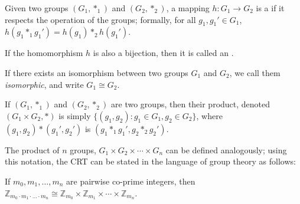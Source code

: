 \begin{frame}

Given two groups $(G_1,\ast_1)$ and $(G_2,\ast_2)$, a mapping
$h:G_1\longrightarrow G_2$ is a  if it respects the
operation of the groups; formally, for all $g_1,g_1'\in G_1$,
$h(g_1\ast_1g_1')=h(g_1)\ast_2h(g_1')$.  

If the homomorphism $h$ is
also a bijection, then it is called an .  

If there
exists an isomorphism between two groups $G_1$ and $G_2$, we call them
{\em isomorphic}, and write $G_1\cong G_2$.

If $(G_1,\ast_1)$ and $(G_2,\ast_2)$ are two groups, then their
product, denoted $(G_1\times G_2,\ast)$ is simply $\{(g_1,g_2):g_1\in
G_1,g_2\in G_2\}$, where $(g_1,g_2)\ast(g_1',g_2')$ is
$(g_1\ast_1g_1',g_2\ast_2g_2')$.  

The product of $n$ groups,
$G_1\times G_2\times\cdots\times G_n$ can be defined analogously;
using this notation, the CRT can be stated in the language of group
theory as follows:

If $m_0,m_1,\ldots,m_n$ are pairwise co-prime integers, then
$\mathbb{Z}_{m_0\cdot m_1\cdot\ldots\cdot m_n}\cong
\mathbb{Z}_{m_0}\times
\mathbb{Z}_{m_1}\times\cdots\times
\mathbb{Z}_{m_n}$.
\end{frame}


